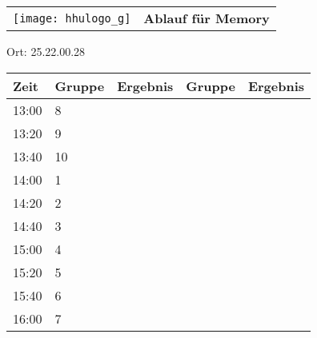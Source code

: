 \documentclass[a4paper,10pt]{article}
\def\spielh{Memory}
\def\raumh{25.22.00.28}
\begin{document}
   \newpage
  \begin{tabularx}{\textwidth}{lc}
    \texttt{[image: hhulogo\_g]}
  & {\Huge \textbf{Ablauf für \spielh}}
  \end{tabularx}
  \LARGE
  \begin{center}
    \vspace{1cm} 
    Ort: \raumh
  \end{center}
    \vspace{2cm} 
    \begin{tabularx}{\textwidth}{X||X|X||X|X}
	\textbf{Zeit} &\textbf{Gruppe} & \textbf{Ergebnis} &\textbf{Gruppe} & \textbf{Ergebnis}  	\\ \hline \hline
	13:00 &	8	&	&	&	\\ \hline
	13:20 &	9	&	&	&	\\ \hline
	13:40 &	10	&	&	&	\\ \hline

	14:00 &	1	&	&	&	\\ \hline
	14:20 &	2	&	&	&	\\ \hline
	14:40 &	3	&	&	&	\\ \hline

	15:00 &	4	&	&	&	\\ \hline
	15:20 &	5	&	&	&	\\ \hline
	15:40 &	6	&	&	&	\\ \hline

	16:00 &	7	&	&	&	\\ \hline
      
    \end{tabularx}
   
\end{document}
